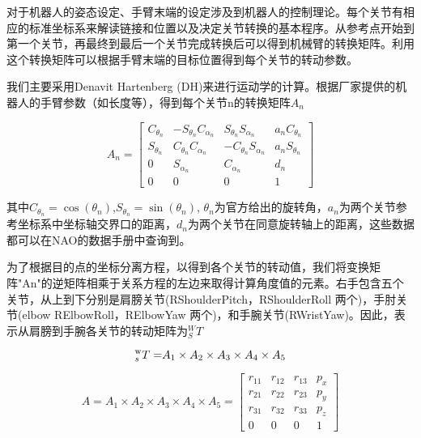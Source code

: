 对于机器人的姿态设定、手臂末端的设定涉及到机器人的控制理论。每个关节有相应的标准坐标系来解读链接和位置以及决定关节转换的基本程序。从参考点开始到第一个关节，再最终到最后一个关节完成转换后可以得到机械臂的转换矩阵。利用这个转换矩阵可以根据手臂末端的目标位置得到每个关节的转动参数。

我们主要采用Denavit Hartenberg (DH)来进行运动学的计算。根据厂家提供的机器人的手臂参数（如长度等），得到每个关节n的转换矩阵$A_n$

\begin{equation}
{{A}_n} = \left[ {\begin{array}{*{20}{c}}
	{{C_{{\theta _n}}}}&{ - {S_{{\theta _n}}}{C_{{\alpha _n}}}}&{{S_{{\theta _n}}}{S_{{\alpha _n}}}}&{{a_n}{C_{{\theta _n}}}}\\
	{{S_{{\theta _n}}}}&{{C_{{\theta _n}}}{C_{{\alpha _n}}}}&{ - {C_{{\theta _n}}}{S_{{\alpha _n}}}}&{{a_n}{S_{{\theta _n}}}}\\
	0&{{S_{{\alpha _n}}}}&{{C_{{\alpha _n}}}}&{{d_n}}\\
	0&0&0&1
	\end{array}} \right]
\end{equation}

其中${C_{{\theta _n}}} = \cos ({\theta _n})$,${S_{{\theta _n}}} = \sin ({\theta _n})$, ${{\theta }_{n}}$为官方给出的旋转角，$a_n$为两个关节参考坐标系中坐标轴交界口的距离，$d_n$为两个关节在同意旋转轴上的距离，这些数据都可以在NAO的数据手册中查询到。

为了根据目的点的坐标分离方程，以得到各个关节的转动值，我们将变换矩阵"An"的逆矩阵相乘于关系方程的左边来取得计算角度值的元素。右手包含五个关节，从上到下分别是肩膀关节(RShoulderPitch，RShoulderRoll 两个)，手肘关节(elbow RElbowRoll，RElbowYaw 两个)，和手腕关节(RWristYaw)。因此，表示从肩膀到手腕各关节的转动矩阵为${}_{S}^{W}{T}$

\begin{equation}
{}_{s}^{\rm{w}}{T = }{{A}_{1}} \times {{A}_{2}} \times {{A}_{3}} \times {{A}_{4}} \times {{A}_{5}}
\end{equation}

\begin{equation}
	A = {A_1} \times {A_2} \times {A_3} \times {A_4} \times {A_5} = \left[ {\begin{array}{*{20}{c}}
		{{r_{11}}}&{{r_{12}}}&{{r_{13}}}&{{p_x}}\\
		{{r_{21}}}&{{r_{22}}}&{{r_{23}}}&{{p_y}}\\
		{{r_{31}}}&{{r_{32}}}&{{r_{33}}}&{{p_z}}\\
		0&0&0&1
		\end{array}} \right]
\end{equation}


